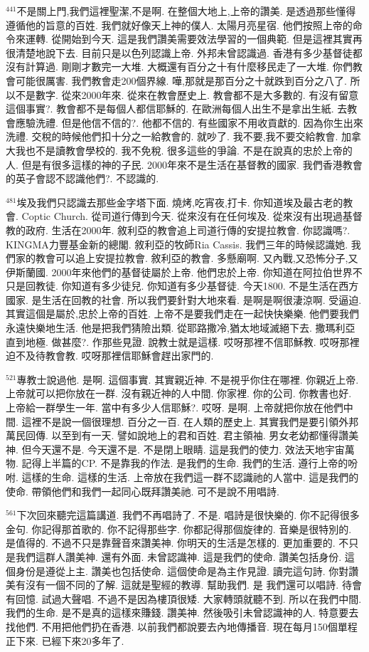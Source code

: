 \documentclass{book}
\begin{document}
$^{441}$不是關上門,我們這裡聖潔,不是啊.
在整個大地上,上帝的讚美.
是透過那些懂得遵循他的旨意的百姓.
我們就好像天上神的僕人.
太陽月亮星宿.
他們按照上帝的命令來運轉.
從開始到今天.
這是我們讚美需要效法學習的一個典範.
但是這裡其實再很清楚地說下去.
目前只是以色列認識上帝.
外邦未曾認識過.
香港有多少基督徒都沒有計算過.
剛剛才數完一大堆.
大概還有百分之十有什麼移民走了一大堆.
你們教會可能很厲害.
我們教會走200個界線.
嘩,那就是那百分之十就跌到百分之八了.
所以不是數字.
從來2000年來.
從來在教會歷史上.
教會都不是大多數的.
有沒有留意這個事實?.
教會都不是每個人都信耶穌的.
在歐洲每個人出生不是拿出生紙.
去教會應驗洗禮.
但是他信不信的?.
他都不信的.
有些國家不用收貢獻的.
因為你生出來洗禮.
交稅的時候他們扣十分之一給教會的.
就吵了.
我不要,我不要交給教會.
加拿大我也不是讀教會學校的.
我不免稅.
很多這些的爭論.
不是在說真的忠於上帝的人.
但是有很多這樣的神的子民.
2000年來不是生活在基督教的國家.
我們香港教會的英子會認不認識他們?.
不認識的.

$^{481}$埃及我們只認識去那些金字塔下面.
燒烤,吃宵夜,打卡.
你知道埃及最古老的教會.
Coptic Church.
從司道行傳到今天.
從來沒有在任何埃及.
從來沒有出現過基督教的政府.
生活在2000年.
敘利亞的教會追上司道行傳的安提拉教會.
你認識嗎?.
KINGMA力豐基金新的總閣.
敘利亞的牧師Ria Cassis.
我們三年的時候認識她.
我們家的教會可以追上安提拉教會.
敘利亞的教會.
多懸廟啊.
又內戰,又恐怖分子,又伊斯蘭國.
2000年來他們的基督徒屬於上帝.
他們忠於上帝.
你知道在阿拉伯世界不只是回教徒.
你知道有多少徒兒.
你知道有多少基督徒.
今天1800.
不是生活在西方國家.
是生活在回教的社會.
所以我們要針對大地來看.
是啊是啊很淒涼啊.
受逼迫.
其實這個是屬於,忠於上帝的百姓.
上帝不是要我們走在一起快快樂樂.
他們要我們永遠快樂地生活.
他是把我們猜險出類.
從耶路撒冷,猶太地域滅絕下去.
撒瑪利亞直到地極.
做甚麼?.
作那些見證.
說教士就是這樣.
哎呀那裡不信耶穌教.
哎呀那裡迫不及待教會教.
哎呀那裡信耶穌會趕出家門的.

$^{521}$專教士說過他.
是啊.
這個事實.
其實親近神.
不是視乎你住在哪裡.
你親近上帝.
上帝就可以把你放在一群.
沒有親近神的人中間.
你家裡.
你的公司.
你教書也好.
上帝給一群學生一年.
當中有多少人信耶穌?.
哎呀.
是啊.
上帝就把你放在他們中間.
這裡不是說一個很理想.
百分之一百.
在人類的歷史上.
其實我們是要引領外邦萬民回傳.
以至到有一天.
譬如說地上的君和百姓.
君主領袖.
男女老幼都懂得讚美神.
但今天還不是.
今天還不是.
不是閉上眼睛.
這是我們的使力.
效法天地宇宙萬物.
記得上半篇的CP.
不是靠我的作法.
是我們的生命.
我們的生活.
遵行上帝的吩咐.
這樣的生命.
這樣的生活.
上帝放在我們這一群不認識祂的人當中.
這是我們的使命.
帶領他們和我們一起同心既拜讚美祂.
可不是說不用唱詩.

$^{561}$下次回來聽完這篇講道.
我們不再唱詩了.
不是.
唱詩是很快樂的.
你不記得很多金句.
你記得那首歌的.
你不記得那些字.
你都記得那個旋律的.
音樂是很特別的.
是值得的.
不過不只是靠聲音來讚美神.
你明天的生活是怎樣的.
更加重要的.
不只是我們這群人讚美神.
還有外面.
未曾認識神.
這是我們的使命.
讚美包括身份.
這個身份是遵從上主.
讚美也包括使命.
這個使命是為主作見證.
讀完這句詩.
你對讚美有沒有一個不同的了解.
這就是聖經的教導.
幫助我們.
是 我們還可以唱詩.
待會有回憶.
試過大聲唱.
不過不是因為樓頂很矮.
大家轉頭就聽不到.
所以在我們中間.
我們的生命.
是不是真的這樣來賺錢.
讚美神.
然後吸引未曾認識神的人.
特意要去找他們.
不用把他們扔在香港.
以前我們都說要去內地傳播音.
現在每月150個單程正下來.
已經下來20多年了.
\end{document}
